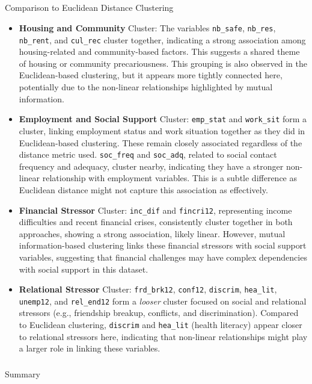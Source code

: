 \documentclass[
]{article}
\makeatletter
\let\oldsubparagraph\subparagraph
\renewcommand{\subparagraph}{
    \@ifstar
      \xxxSubParagraphStar
      \xxxSubParagraphNoStar
  }
\newcommand{\xxxSubParagraphStar}[1]{\oldsubparagraph*{#1}\mbox{}}
\newcommand{\xxxSubParagraphNoStar}[1]{\oldsubparagraph{#1}\mbox{}}
\makeatother
\begin{document}
\subparagraph{Comparison to Euclidean Distance
Clustering}\label{comparison-to-euclidean-distance-clustering}

\begin{itemize}
\item
  \textbf{Housing and Community} Cluster: The variables
  \texttt{nb\_safe}, \texttt{nb\_res}, \texttt{nb\_rent}, and
  \texttt{cul\_rec} cluster together, indicating a strong association
  among housing-related and community-based factors. This suggests a
  shared theme of housing or community precariousness. This grouping is
  also observed in the Euclidean-based clustering, but it appears more
  tightly connected here, potentially due to the non-linear
  relationships highlighted by mutual information.
\item
  \textbf{Employment and Social Support} Cluster: \texttt{emp\_stat} and
  \texttt{work\_sit} form a cluster, linking employment status and work
  situation together as they did in Euclidean-based clustering. These
  remain closely associated regardless of the distance metric used.
  \texttt{soc\_freq} and \texttt{soc\_adq}, related to social contact
  frequency and adequacy, cluster nearby, indicating they have a
  stronger non-linear relationship with employment variables. This is a
  subtle difference as Euclidean distance might not capture this
  association as effectively.
\item
  \textbf{Financial Stressor} Cluster: \texttt{inc\_dif} and
  \texttt{fincri12}, representing income difficulties and recent
  financial crises, consistently cluster together in both approaches,
  showing a strong association, likely linear. However, mutual
  information-based clustering links these financial stressors with
  social support variables, suggesting that financial challenges may
  have complex dependencies with social support in this dataset.
\item
  \textbf{Relational Stressor} Cluster: \texttt{frd\_brk12},
  \texttt{conf12}, \texttt{discrim}, \texttt{hea\_lit},
  \texttt{unemp12}, and \texttt{rel\_end12} form a \emph{looser} cluster
  focused on social and relational stressors (e.g., friendship breakup,
  conflicts, and discrimination). Compared to Euclidean clustering,
  \texttt{discrim} and \texttt{hea\_lit} (health literacy) appear closer
  to relational stressors here, indicating that non-linear relationships
  might play a larger role in linking these variables.
\end{itemize}

\subparagraph{Summary}\label{summary-2}
\end{document}
